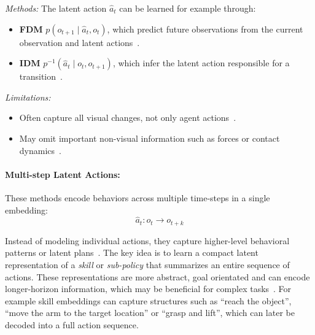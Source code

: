 \textit{Methods:}
The latent action $\hat{a}_t$ can be learned for example through:
\begin{itemize}
    \item \textbf{\ac{FDM}} $p(o_{t+1} \mid \hat{a}_t, o_t)$, which predict future observations from the current observation and latent actions~\cite{Bruce2024GenieGI, Edwards2018ImitatingLP, Schmidt2023LearningTA, Ye2024LatentAP, Rybkin2018LearningWY}.
    \item \textbf{\ac{IDM}} $p^{-1}(\hat{a}_t \mid o_t, o_{t+1})$, which infer the latent action responsible for a transition~\cite{Schmidt2023LearningTA, Bruce2024GenieGI}. 
\end{itemize}

\textit{Limitations:}
\begin{itemize}
    \item Often capture all visual changes, not only agent actions~\cite{McCarthy_2025}.
    \item May omit important non-visual information such as forces or contact dynamics~\cite{McCarthy_2025}.
\end{itemize}








\paragraph{Multi-step Latent Actions:}

These methods encode behaviors across multiple time-steps in a single embedding:
\begin{equation}
\hat{a}_t : o_t \rightarrow o_{t+k}
\end{equation}

Instead of modeling individual actions, they capture higher-level behavioral patterns or latent plans~\cite{McCarthy_2025}.
The key idea is to learn a compact latent representation of a \emph{skill} or \emph{sub-policy} that summarizes an entire sequence of actions. These representations are more abstract, goal orientated and can encode longer-horizon information, which may be beneficial for complex tasks~\cite{RoseteBeas2022LatentPF, Cui2022FromPT, lynch2020learning}. 
For example skill embeddings can capture structures such as ``reach the object'', ``move the arm to the target location'' or ``grasp and lift'', which can later be decoded into a full action sequence.





